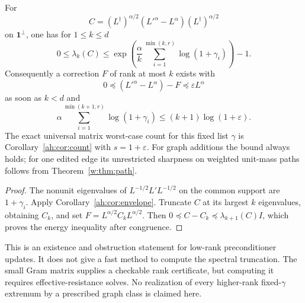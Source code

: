 \begin{corollary}\label{ah:cor:graph}
For
\[
 C=(L^\dagger)^{\alpha/2}(L'^\alpha-L^\alpha)
      (L^\dagger)^{\alpha/2}
\]
on $\mathbf1^\perp$, one has for $1\le k\le d$
\[
 0\le\lambda_k(C)
 \le\exp\left(\frac\alpha k
      \sum_{i=1}^{\min(k,r)}\log(1+\gamma_i)\right)-1.
\]
Consequently a correction $F$ of rank at most $k$ exists with
\[
 0\preceq (L'^\alpha-L^\alpha)-F\preceq\varepsilon L^\alpha
\]
as soon as $k<d$ and
\[
 \alpha\sum_{i=1}^{\min(k+1,r)}\log(1+\gamma_i)
 \le(k+1)\log(1+\varepsilon).
\]
The exact universal matrix worst-case count for this fixed list
$\gamma$ is Corollary~\ref{ah:cor:count} with $s=1+\varepsilon$.
For graph additions the bound always holds; for one edited edge its
unrestricted sharpness on weighted unit-mass paths follows from Theorem~\ref{w:thm:path}.
\end{corollary}
\begin{proof}
The nonunit eigenvalues of $L^{-1/2}L'L^{-1/2}$ on the common support
are $1+\gamma_i$. Apply Corollary~\ref{ah:cor:envelope}.
Truncate $C$ at its largest $k$ eigenvalues, obtaining $C_k$,
and set $F=L^{\alpha/2}C_kL^{\alpha/2}$.
Then $0\preceq C-C_k\preceq\lambda_{k+1}(C)I$, which proves the
energy inequality after congruence.
\end{proof}

This is an existence and obstruction statement for low-rank
preconditioner updates. It does not give a fast method to compute the
spectral truncation. The small Gram matrix supplies a checkable rank
certificate, but computing it requires effective-resistance solves.
No realization of every higher-rank fixed-$\gamma$ extremum by a
prescribed graph class is claimed here.

